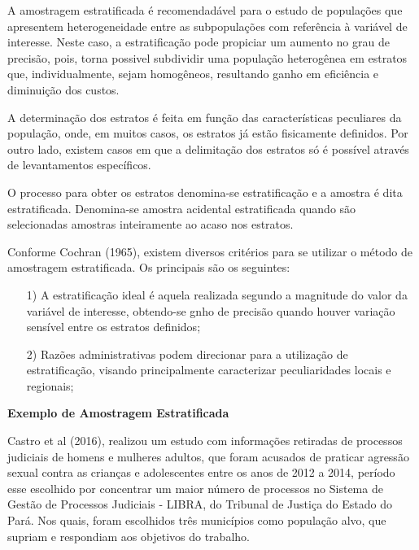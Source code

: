 
A amostragem estratificada é recomendadável para o estudo de
populações que apresentem heterogeneidade entre as subpopulações
com referência à variável de interesse. Neste caso, a
estratificação pode propiciar um aumento no grau de precisão,
pois, torna possivel subdividir uma população heterogênea em
estratos que, individualmente, sejam homogêneos, resultando ganho
em eficiência e diminuição dos custos.\vskip0.3cm


A determinação dos estratos é feita em função das características
peculiares da população, onde, em muitos casos, os estratos já
estão fisicamente definidos. Por outro lado, existem casos em que
a delimitação dos estratos só é possível através de levantamentos
específicos.\vskip0.3cm


O processo para obter os estratos denomina-se estratificação e a
amostra é dita estratificada. Denomina-se amostra acidental
estratificada quando são selecionadas amostras inteiramente ao
acaso nos estratos.\vskip0.3cm

Conforme Cochran (1965), existem diversos critérios para se
utilizar o método de amostragem estratificada. Os principais são
os seguintes:


\begin{enumerate}
  \item[{1)}] A estratificação ideal é aquela realizada segundo a magnitude do valor da variável de interesse,
  obtendo-se gnho de precisão quando houver variação sensível entre os estratos definidos;
  \item[{2)}] Razões administrativas podem direcionar para a utilização de estratificação, visando
  principalmente caracterizar peculiaridades locais e regionais;
\end{enumerate}


\textbf{Exemplo de Amostragem Estratificada}
\vskip0.3cm

Castro et al (2016), realizou um estudo com informações retiradas de processos
judiciais de homens e mulheres adultos, que foram acusados de praticar agressão
sexual contra as crianças e adolescentes entre os anos de 2012 a 2014, período esse
escolhido por concentrar um maior número de processos no Sistema de Gestão de
Processos Judiciais - LIBRA, do Tribunal de Justiça do Estado do Pará. Nos quais,
foram escolhidos três municípios como população alvo, que supriam e respondiam aos objetivos do trabalho.\vskip0.3cm

